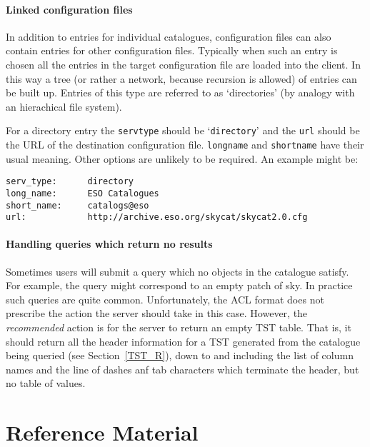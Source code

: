 \documentclass[twoside,11pt]{article}
\newcommand{\stardocinitials}  {SSN}
\newcommand{\stardocnumber}    {75.1}
\newcommand{\stardocname}{\stardocinitials /\stardocnumber}
\renewcommand{\_}{\texttt{\symbol{95}}}
\begin{document}
\subsection{Linked configuration files}

In addition to entries for individual catalogues, configuration files
can also contain entries for other configuration files.  Typically
when such an entry is chosen all the entries in the target configuration
file are loaded into the client.  In this way a tree (or rather a network,
because recursion is allowed) of entries can be built up.  Entries of
this type are referred to as `directories' (by analogy with an hierachical
file system).

For a directory entry the {\tt serv\_type} should be `{\tt directory}'
and the {\tt url} should be the URL of the destination configuration
file.  {\tt long\_name} and {\tt short\_name} have their usual meaning.
Other options are unlikely to be required.  An example might be:

\begin{verbatim}
serv_type:      directory
long_name:      ESO Catalogues
short_name:     catalogs@eso
url:            http://archive.eso.org/skycat/skycat2.0.cfg
\end{verbatim}

\subsection{Handling queries which return no results}

Sometimes users will submit a query which no objects in the catalogue
satisfy.  For example, the query might correspond to an empty patch of
sky.  In practice such queries are quite common.  Unfortunately, the ACL
format does not prescribe the action the server should take in this case.
However, the {\it recommended}\/ action is for the server to return an
empty TST table.  That is, it should return all the header information
for a TST generated from the catalogue being queried (see 
Section~\ref{TST_R}), down to and including the list of column names
and the line of dashes anf tab characters which terminate the header,
but no table of values.


\cleardoublepage
\markboth{\stardocname}{\stardocname}
\part{Reference Material}
\end{document}
